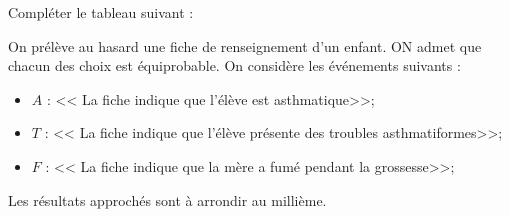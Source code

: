 \begin{questions}
	\question[2] Compléter le tableau suivant :
	
	\begin{center}
		
	\end{center}

	\begin{solution}
		\begin{center}
			
		\end{center}
	\end{solution}

	\question On prélève au hasard une fiche de renseignement d'un enfant. ON admet que chacun des choix est équiprobable. On considère les événements suivants :
	
	\begin{itemize}
		\item $A$ : << La fiche indique que l'élève est asthmatique>>; 
		\item $T$ : << La fiche indique que l'élève présente des troubles asthmatiformes>>;
		\item $F$ : << La fiche indique que la mère a fumé pendant la grossesse>>;
	\end{itemize}

	Les résultats approchés sont à arrondir au millième.
	
\end{questions}
